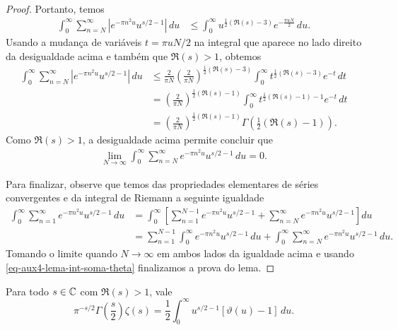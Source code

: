 \begin{proof}
    Portanto, temos 
    \begin{align}
    \int_0^{\infty}\!\sum_{n=N}^{\infty} |e^{-\pi n^2u}u^{s/2 - 1}| \, du
    &\leqslant
    \int_0^{\infty}
    u^{\frac{1}{2}(\Re(s)-3)}
    e^{-\frac{\pi u N}{2}}
    \, du.
    \end{align}
    Usando a mudança de variáveis $t=\pi u N/2$ na integral que aparece no lado direito da desigualdade acima e também que $\Re(s)>1$, obtemos
    \begin{align*}
    \int_0^{\infty}\!\sum_{n=N}^{\infty} |e^{-\pi n^2u}u^{s/2 - 1}| \, du
    &\leqslant
    \frac{2}{\pi N}
    \left(\frac{2}{\pi N}\right)^{\frac{1}{2}(\Re(s)-3)}
    \int_0^{\infty}
    t^{\frac{1}{2}(\Re(s)-3)}
    e^{-t}
    \, dt
    \\[0.3cm]
    &=
    \left(\frac{2}{\pi N}\right)^{\frac{1}{2}(\Re(s)-1)}
    \int_0^{\infty}
    t^{\frac{1}{2}(\Re(s)-1)-1}
    e^{-t}
    \, dt
    \\[0.3cm]
    &=
    \left(\frac{2}{\pi N}\right)^{\frac{1}{2}(\Re(s)-1)}
    \Gamma\left(\frac{1}{2}\left(\Re(s)-1\right)\right).
    \end{align*}
    Como $\Re(s) > 1$, a desigualdade acima permite concluir que 
    \begin{align}
    \label{eq-aux4-lema-int-soma-theta}
    \lim_{N\to\infty}
    \int_0^{\infty}\sum_{n=N}^{\infty} e^{-\pi n^2u}u^{s/2 - 1} \, du
    =
    0.
    \end{align}
    
    Para finalizar, observe que temos das propriedades elementares
    de séries convergentes e da integral de Riemann 
    a seguinte igualdade
    \begin{align*}
    \int_0^{\infty}\sum_{n=1}^{\infty} e^{-\pi n^2u}u^{s/2 - 1} \, du  
    &=
    \int_0^{\infty}
    \left[ 
    \sum_{n=1}^{N-1} e^{-\pi n^2u}u^{s/2 - 1}
    +
    \sum_{n=N}^{\infty} e^{-\pi n^2u}u^{s/2 - 1} 
    \right]
    du
    \\[0.3cm]
    &=
    \sum_{n=1}^{N-1}
    \int_0^{\infty}
    e^{-\pi n^2u}u^{s/2 - 1}\, du
    +
    \int_{0}^{\infty}
    \sum_{n=N}^{\infty} e^{-\pi n^2u}u^{s/2 - 1}\, du.
    \end{align*}
    Tomando o limite quando $N\to\infty$ 
    em ambos lados da igualdade acima e 
    usando \eqref{eq-aux4-lema-int-soma-theta} finalizamos a prova do lema.
    \end{proof}
    \begin{teorema}
    \label{teo-zeta-gamma-teta}
        Para todo $s\in\mathbb{C}$ com $\Re(s) > 1$, vale
        \[
        \pi^{-s/2}\Gamma\left( \frac{s}{2} \right)\zeta(s) 
        = \frac{1}{2}\int_0^{\infty} u^{s/2 - 1}[\vartheta(u) - 1] \, du.
        \]
    \end{teorema}

